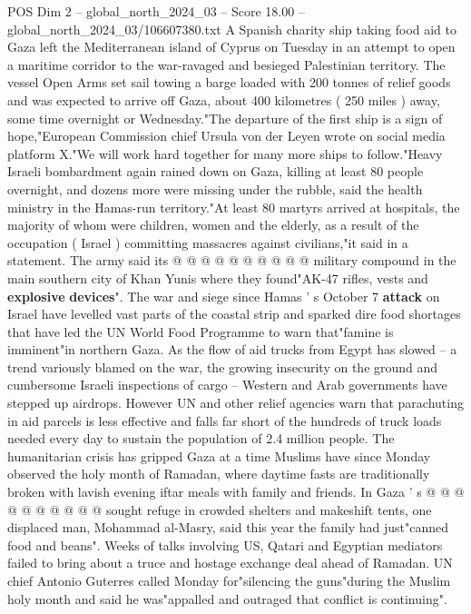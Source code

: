 \begin{textsample}{POS Dim 2 – global\_north\_2024\_03 – Score 18.00 – global\_north\_2024\_03/106607380.txt}  \label{ex:f2_pos_368}
A Spanish charity ship taking food aid to Gaza left the Mediterranean island of Cyprus on Tuesday in an attempt to open a maritime corridor to the war-ravaged and besieged Palestinian territory.
The vessel Open Arms set sail towing a barge loaded with 200 tonnes of relief goods and was expected to arrive off Gaza, about 400 kilometres ( 250 miles ) away, some time overnight or Wednesday."The departure of the first ship is a sign of hope,"European Commission chief Ursula von der Leyen wrote on social media platform X."We will work hard together for many more ships to follow."Heavy Israeli bombardment again rained down on Gaza, killing at least 80 people overnight, and dozens more were missing under the rubble, said the health ministry in the Hamas-run territory."At least 80 martyrs arrived at hospitals, the majority of whom were children, women and the elderly, as a result of the occupation ( Israel ) committing massacres against civilians,"it said in a statement.
The army said its @ @ @ @ @ @ @ @ @ @ military compound in the main southern city of Khan Yunis where they found"AK-47 rifles, vests and \textbf{explosive} \textbf{devices}".
The war and siege since Hamas ' s October 7 \textbf{attack} on Israel have levelled vast parts of the coastal strip and sparked dire food shortages that have led the UN World Food Programme to warn that"famine is imminent"in northern Gaza.
As the flow of aid trucks from Egypt has slowed -- a trend variously blamed on the war, the growing insecurity on the ground and cumbersome Israeli inspections of cargo -- Western and Arab governments have stepped up airdrops.
However UN and other relief agencies warn that parachuting in aid parcels is less effective and falls far short of the hundreds of truck loads needed every day to sustain the population of 2.4 million people.
The humanitarian crisis has gripped Gaza at a time Muslims have since Monday observed the holy month of Ramadan, where daytime fasts are traditionally broken with lavish evening iftar meals with family and friends.
In Gaza ' s @ @ @ @ @ @ @ @ @ @ sought refuge in crowded shelters and makeshift tents, one displaced man, Mohammad al-Masry, said this year the family had just"canned food and beans".
Weeks of talks involving US, Qatari and Egyptian mediators failed to bring about a truce and hostage exchange deal ahead of Ramadan.
UN chief Antonio Guterres called Monday for"silencing the guns"during the Muslim holy month and said he was"appalled and outraged that conflict is continuing".

\end{textsample}
